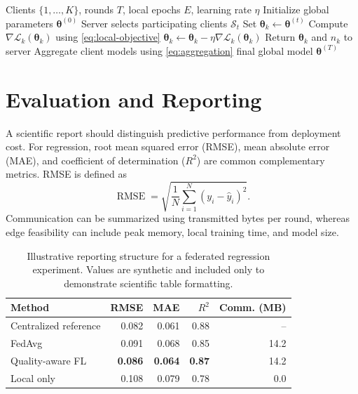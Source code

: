 \documentclass[10pt]{article}
\newcommand{\loss}{\mathcal{L}}
\begin{document}
\begin{algorithm}[htbp]
\caption{Quality-Aware Federated Regression}
\label{alg:qafl}
\begin{algorithmic}[1]
\Require Clients $\{1,\ldots,K\}$, rounds $T$, local epochs $E$, learning rate $\eta$
\State Initialize global parameters $\boldsymbol{\theta}^{(0)}$
    \State Server selects participating clients $\mathcal{S}_t$
        \State Set $\boldsymbol{\theta}_k \gets \boldsymbol{\theta}^{(t)}$
            \State Compute $\nabla\loss_k(\boldsymbol{\theta}_k)$ using \cref{eq:local-objective}
            \State $\boldsymbol{\theta}_k \gets \boldsymbol{\theta}_k - \eta\nabla\loss_k(\boldsymbol{\theta}_k)$
        \EndFor
        \State Return $\boldsymbol{\theta}_k$ and $n_k$ to server
    \EndFor
    \State Aggregate client models using \cref{eq:aggregation}
\EndFor
\State \Return final global model $\boldsymbol{\theta}^{(T)}$
\end{algorithmic}
\end{algorithm}

\section{Evaluation and Reporting}

A scientific report should distinguish predictive performance from deployment cost. For regression, root mean squared error (RMSE), mean absolute error (MAE), and coefficient of determination ($R^2$) are common complementary metrics. RMSE is defined as
\begin{equation}
\operatorname{RMSE}
= \sqrt{\frac{1}{N}\sum_{i=1}^{N}\left(y_i-\hat{y}_i\right)^2}.
\label{eq:rmse}
\end{equation}
Communication can be summarized using transmitted bytes per round, whereas edge feasibility can include peak memory, local training time, and model size.

\begin{table}[htbp]
\centering
\caption{Illustrative reporting structure for a federated regression experiment. Values are synthetic and included only to demonstrate scientific table formatting.}
\label{tab:results}
\small
\begin{tabular}{lrrrr}
\toprule
Method & RMSE & MAE & $R^2$ & Comm. (MB) \\
\midrule
Centralized reference & 0.082 & 0.061 & 0.88 & -- \\
FedAvg & 0.091 & 0.068 & 0.85 & 14.2 \\
Quality-aware FL & \textbf{0.086} & \textbf{0.064} & \textbf{0.87} & 14.2 \\
Local only & 0.108 & 0.079 & 0.78 & 0.0 \\
\bottomrule
\end{tabular}
\end{table}
\end{document}
